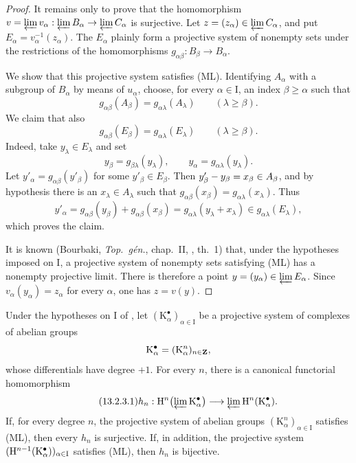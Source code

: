 \begin{proof}
It remains only to prove that the homomorphism $v=\varprojlim v_\alpha:\varprojlim B_\alpha\to\varprojlim C_\alpha$
is surjective.
Let $z=(z_\alpha)\in\varprojlim C_\alpha$, and put $E_\alpha=v_\alpha^{-1}(z_\alpha)$.
The $E_\alpha$ plainly form a projective system of nonempty sets under
the restrictions of the homomorphisms
$g_{\alpha\beta}:B_\beta\longrightarrow B_\alpha$.

We show that this projective system satisfies (ML).
Identifying $A_\alpha$ with a subgroup of $B_\alpha$ by means of
$u_\alpha$, choose, for every $\alpha\in\mathrm{I}$, an index
$\beta\geq\alpha$ such that
\[
  g_{\alpha\beta}(A_\beta)
  =
  g_{\alpha\lambda}(A_\lambda)
  \qquad(\lambda\geq\beta).
\]
We claim that also
\[
  g_{\alpha\beta}(E_\beta)
  =
  g_{\alpha\lambda}(E_\lambda)
  \qquad(\lambda\geq\beta).
\]
Indeed, take $y_\lambda\in E_\lambda$ and set
\[
  y_\beta=g_{\beta\lambda}(y_\lambda),
  \qquad
  y_\alpha=g_{\alpha\lambda}(y_\lambda).
\]
Let $y'_\alpha=g_{\alpha\beta}(y'_\beta)$ for some
$y'_\beta\in E_\beta$.
Then $y'_\beta- y_\beta=x_\beta\in A_\beta$, and by hypothesis there
is an $x_\lambda\in A_\lambda$ such that $g_{\alpha\beta}(x_\beta)
=
g_{\alpha\lambda}(x_\lambda)$.
Thus
\[
  y'_\alpha
  =
  g_{\alpha\beta}(y_\beta)+g_{\alpha\beta}(x_\beta)
  =
  g_{\alpha\lambda}(y_\lambda+x_\lambda)
  \in g_{\alpha\lambda}(E_\lambda),
\]
which proves the claim.

It is known (Bourbaki, \emph{Top.\ g\'{e}n.}, chap.~II,
, th.~1) that, under the hypotheses imposed on
$\mathrm{I}$, a projective system of nonempty sets satisfying (ML)
has a nonempty projective limit.
There is therefore a point
$y=(y_\alpha)\in\varprojlim E_\alpha$.
Since $v_\alpha(y_\alpha)=z_\alpha$ for every $\alpha$, one has
$z=v(y)$.
\end{proof}

\begin{proposition}[13.2.3]
\label{0.13.2.3}
Under the hypotheses on $\mathrm{I}$ of , let
$(\mathrm{K}^\bullet_\alpha)_{\alpha\in\mathrm{I}}$ be a projective
system of complexes of abelian groups
\[
  \mathrm{K}^\bullet_\alpha
  =
  (\mathrm{K}^n_\alpha)_{n\in\mathbf{Z}},
\]
whose differentials have degree $+1$.
For every $n$, there is a canonical functorial homomorphism
\begin{equation}
\label{0.13.2.3.1}
\tag{13.2.3.1}
  h_n:
  \mathrm{H}^n\bigl(\varprojlim\mathrm{K}^\bullet_\alpha\bigr)
  \longrightarrow
  \varprojlim\mathrm{H}^n(\mathrm{K}^\bullet_\alpha).
\end{equation}
If, for every degree $n$, the projective system of abelian groups
$(\mathrm{K}^n_\alpha)_{\alpha\in\mathrm{I}}$ satisfies {\rm(ML)},
then every $h_n$ is surjective.
If, in addition, the projective system
$(\mathrm{H}^{n-1}(\mathrm{K}^\bullet_\alpha))_{\alpha\in\mathrm{I}}$
satisfies {\rm(ML)}, then $h_n$ is bijective.
\end{proposition}

